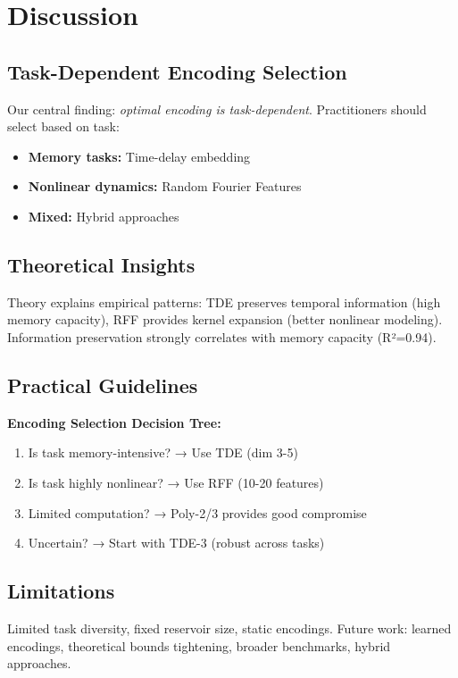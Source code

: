 \documentclass[11pt]{article}
\begin{document}
\section{Discussion}

\subsection{Task-Dependent Encoding Selection}

Our central finding: \emph{optimal encoding is task-dependent}. Practitioners should select based on task:
\begin{itemize}
    \item \textbf{Memory tasks:} Time-delay embedding
    \item \textbf{Nonlinear dynamics:} Random Fourier Features
    \item \textbf{Mixed:} Hybrid approaches
\end{itemize}

\subsection{Theoretical Insights}

Theory explains empirical patterns: TDE preserves temporal information (high memory capacity), RFF provides kernel expansion (better nonlinear modeling). Information preservation strongly correlates with memory capacity (R²=0.94).

\subsection{Practical Guidelines}

\textbf{Encoding Selection Decision Tree:}
\begin{enumerate}
    \item Is task memory-intensive? → Use TDE (dim 3-5)
    \item Is task highly nonlinear? → Use RFF (10-20 features)
    \item Limited computation? → Poly-2/3 provides good compromise
    \item Uncertain? → Start with TDE-3 (robust across tasks)
\end{enumerate}

\subsection{Limitations}

Limited task diversity, fixed reservoir size, static encodings. Future work: learned encodings, theoretical bounds tightening, broader benchmarks, hybrid approaches.
\end{document}
